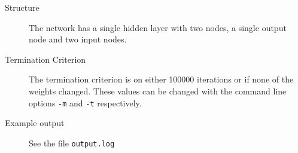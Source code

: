 \documentclass[10pt,a4paper,boxed]{hmcpset}
\begin{document}
		\begin{problem}
		\end{problem}
		\begin{solution}
			\begin{description}
				\item[Structure] The network has a single hidden layer with two nodes, a
					single output node and two input nodes.
				\item[Termination Criterion] The termination criterion is on either
					100000 iterations or if none of the weights changed. These values can
					be changed with the command line options \verb$-m$ and \verb$-t$
					respectively.
				\item[Example output] See the file \verb$output.log$
			\end{description}
		\end{solution}
		
\end{document}
